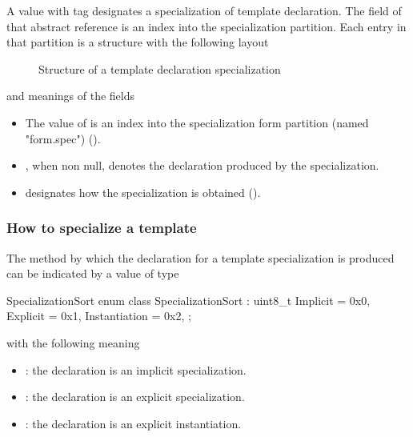 A  value with tag  designates a specialization of template declaration.
The  field of that abstract reference is an index into the specialization partition.
Each entry in that partition is a structure with the following layout
%
\begin{figure}[H]
	\centering
	\caption{Structure of a template declaration specialization}
	\label{fig:ifc-specialization-declaration}
\end{figure}
%
and meanings of the fields
\begin{itemize}
	\item The value of  is an index into the specialization form partition (named "form.spec") ().
	\item {}, when non null, denotes the declaration produced by the specialization.
	\item {} designates how the specialization is obtained ().
\end{itemize}


\subsubsection{How to specialize a template}
\label{sec:ifc-SpecializationSort}

The method by which the declaration for a template specialization is produced can be indicated by a value of type
%
\begin{typedef}{SpecializationSort}{}
	enum class SpecializationSort : uint8_t {
		Implicit = 0x0,
		Explicit = 0x1,
		Instantiation = 0x2,
	};
\end{typedef}
%
with the following meaning
\begin{itemize}
	\item {}: the declaration is an implicit specialization.
	\item {}: the declaration is an explicit specialization.
	\item {}: the declaration is an explicit instantiation.
\end{itemize}


